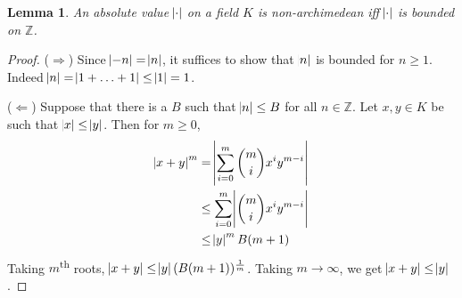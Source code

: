 \documentclass[11pt]{article}
\theoremstyle{definition}
\theoremstyle{plain}
\newtheorem{lemma}[definition]{Lemma}
\theoremstyle{remark}
\newcommand{\bZ}{\mathbb{Z}}
\begin{document}
\begin{lemma}\label{lem:7_9}
    An absolute value $\abs{\cdot}$ on a field $K$ is non-archimedean iff $\abs{\cdot}$ is bounded on $\bZ$.
\end{lemma}
\begin{proof}
    ($\Rightarrow$) Since $\abs{-n} = \abs{n}$, it suffices to show that $\abs{n}$ is bounded for $n \ge 1$. Indeed $\abs{n} = \abs{1 + \ldots + 1} \le \abs{1} = 1$.

    \noindent ($\Leftarrow$) Suppose that there is a $B$ such that $\abs{n} \le B$ for all $n \in \bZ$. Let $x, y \in K$ be such that $\abs{x} \le \abs{y}$. Then for $m \ge 0$,
    \begin{align*}
        \abs{x + y}^m
        &= \abs{\sum_{i=0}^m \binom{m}{i} x^i y^{m-i}}\\
        &\le \sum_{i=0}^m \abs{\binom{m}{i} x^i y^{m-i}}\\
        &\le \abs{y}^m B (m+1)
    \end{align*}
    Taking $m$\textsuperscript{th} roots, $\abs{x + y} \le \abs{y} (B (m + 1))^\frac{1}{m}$. Taking $m \to \infty$, we get $\abs{x + y} \le \abs{y}$.
\end{proof}
\end{document}
